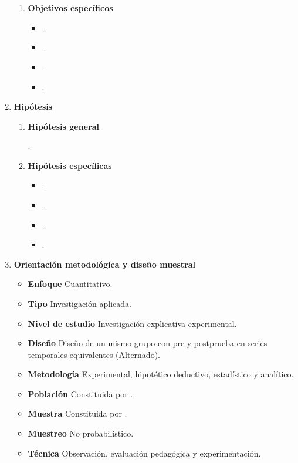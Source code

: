 \documentclass[12pt,a4paper]{article}
\begin{document}
\begin{enumerate}
\begin{enumerate}
		      \item \textbf{Objetivos específicos }
		            \begin{itemize}
			            \item \objetivoe.
			            \item \objetivoee.
			            \item \objetivoeee.
			            \item \objetivoeeee.
		            \end{itemize}
	      \end{enumerate}
	\item \textbf{Hipótesis }
	      \begin{enumerate}
		      \item \textbf{Hipótesis general}

		            \hipotesis.
		      \item \textbf{Hipótesis específicas}
		            \begin{itemize}
			            \item \hipotesise.
			            \item \hipotesisee.
			            \item \hipotesiseee.
			            \item \hipotesiseeee.
		            \end{itemize}
	      \end{enumerate}
	\item \textbf{Orientación metodológica y diseño muestral}
	      \begin{itemize}
		      \item \textbf{Enfoque} Cuantitativo.
		      \item \textbf{Tipo} Investigación aplicada.
		      \item \textbf{Nivel de estudio} Investigación explicativa experimental.
		      \item \textbf{Diseño} Diseño \MakeTextLowercase{\diseno} de un mismo grupo
		            con pre y postprueba en series temporales equivalentes (Alternado).
		      \item \textbf{Metodología} Experimental, hipotético deductivo, estadístico
		            y analítico.
		      \item \textbf{Población} Constituida por \poblacion.
		      \item \textbf{Muestra} Constituida por \muestra.
		      \item \textbf{Muestreo} No probabilístico.
		      \item \textbf{Técnica} Observación, evaluación pedagógica y experimentación.

\end{itemize}
\end{enumerate}
\end{document}
